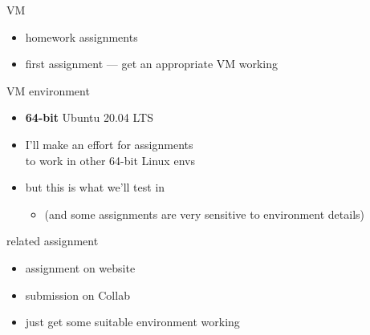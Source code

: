 
\begin{frame}{VM}
    \begin{itemize}
    \item homework assignments
    \item first assignment --- get an appropriate VM working
    \end{itemize}
\end{frame}

\begin{frame}{VM environment}
    \begin{itemize}
    \item \textbf{64-bit} Ubuntu 20.04 LTS
    \item I'll make an effort for assignments \\to work in other 64-bit Linux envs
    \item but this is what we'll test in
        \begin{itemize}
        \item (and some assignments are very sensitive to environment details)
        \end{itemize}
    \end{itemize}
\end{frame}
\begin{frame}{related assignment}
    \begin{itemize}
    \item assignment on website
    \item submission on Collab
    \item just get some suitable environment working
    \end{itemize}
\end{frame}

